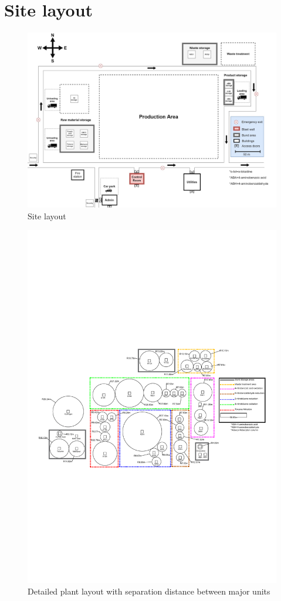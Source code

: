 \section{Site layout}

\begin{figure}[H]
    \centering
    \includegraphics[width=\linewidth]{chapters/Z-support/figures/Sitelayout.jpg}
    \caption{Site layout}
    \label{fig:site}
\end{figure}

\begin{figure}[H]
    \centering
    \includegraphics[width=\linewidth]{chapters/Z-support/figures/Separation distances 2.pdf}
    \caption{Detailed plant layout with separation distance between major units}
    \label{fig:detailed_layout}
\end{figure}